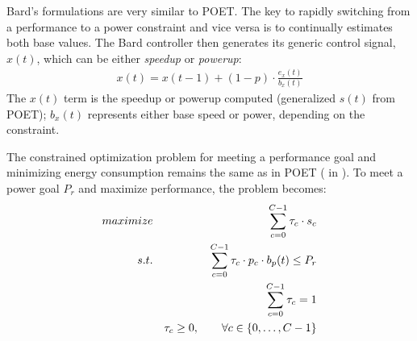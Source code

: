 Bard's formulations are very similar to POET.
The key to rapidly switching from a performance to a power constraint and vice versa is to continually estimates both base values.
The Bard controller then generates its generic control signal, $x(t)$, which can be either \emph{speedup} or \emph{powerup}:
\begin{eqnarray}
  x(t) = x(t-1) + (1-p) \cdot \frac{e_x(t)}{b_x(t)}
  \label{eqn:bard-xup-control}
\end{eqnarray}
The $x(t)$ term is the speedup or powerup computed (generalized $s(t)$ from POET); $b_x(t)$ represents either base speed or power, depending on the constraint.

The constrained optimization problem for meeting a performance goal and minimizing energy consumption remains the same as in POET ( in ).
To meet a power goal $P_r$ and maximize performance, the problem becomes:
\begin{eqnarray}
  \maximize && \sum_{c=0}^{C-1} \tau_c \cdot s_c \label{eqn:timing} \\
  \st %
  && \sum_{c=0}^{C-1} \tau_c \cdot p_c \cdot b_p(t) \le P_r \label{eqn:power} \\
  && \sum_{c=0}^{C-1} \tau_c = 1 \label{eqn:work} \\
  && \tau_c \ge 0, \qquad \forall c \in \{0,\ldots,C-1\} \label{eqn:time}
\end{eqnarray}

